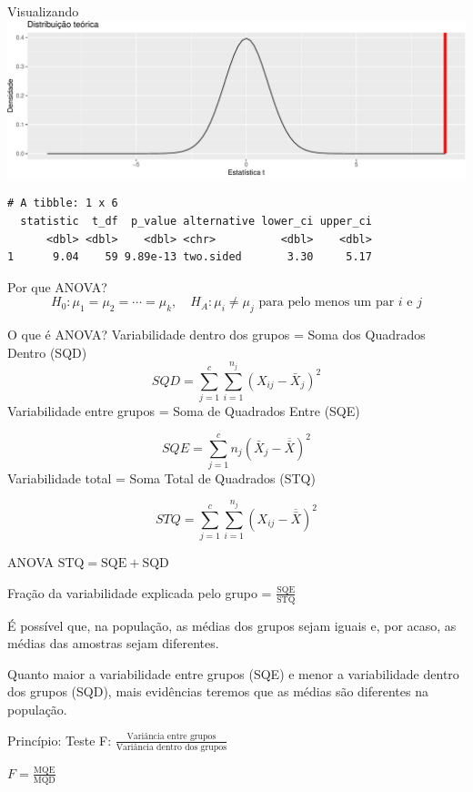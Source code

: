 \documentclass[
  9pt,
  ignorenonframetext,
  aspectratio=169]{beamer}
\begin{document}
\begin{frame}[fragile]{Visualizando}
\protect\hypertarget{visualizando-1}{}
\includegraphics{aula_11_files/figure-beamer/unnamed-chunk-13-1.pdf}

\begin{verbatim}
# A tibble: 1 x 6
  statistic  t_df  p_value alternative lower_ci upper_ci
      <dbl> <dbl>    <dbl> <chr>          <dbl>    <dbl>
1      9.04    59 9.89e-13 two.sided       3.30     5.17
\end{verbatim}
\end{frame}

\begin{frame}{Por que ANOVA?}
\protect\hypertarget{por-que-anova}{}
\[
H_{0}: \mu_{1}=\mu_{2}=\cdots=\mu_{k}, \quad H_{A}: \mu_{i} \neq \mu_{j} \text{ para pelo menos um par } i \text{ e } j
\]
\end{frame}

\begin{frame}{O que é ANOVA?}
\protect\hypertarget{o-que-uxe9-anova}{}
Variabilidade dentro dos grupos = Soma dos Quadrados Dentro (SQD) \[
S Q D=\sum_{j=1}^{c} \sum_{i=1}^{n_{j}}\left(X_{i j}-\bar{X}_{j}\right)^{2}
\] Variabilidade entre grupos = Soma de Quadrados Entre (SQE)

\[
S Q E=\sum_{j=1}^{c} n_{j}\left(\bar{X}_{j}-\overline{\bar{X}}\right)^{2}
\] Variabilidade total = Soma Total de Quadrados (STQ)

\[
S T Q=\sum_{j=1}^{c} \sum_{i=1}^{n_{j}}\left(X_{i j}-\overline{\bar{X}}\right)^{2}
\]
\end{frame}

\begin{frame}{ANOVA}
\protect\hypertarget{anova}{}
\(\text{STQ} = \text{SQE} + \text{SQD}\)

Fração da variabilidade explicada pelo grupo =
\(\frac{\text{SQE}}{\text{STQ}}\)

É possível que, na população, as médias dos grupos sejam iguais e, por
acaso, as médias das amostras sejam diferentes.

Quanto maior a variabilidade entre grupos (SQE) e menor a variabilidade
dentro dos grupos (SQD), mais evidências teremos que as médias são
diferentes na população.

Princípio: Teste F:
\(\frac{\text{Variância entre grupos}}{\text{Variância dentro dos grupos}}\)

\(F = \frac{\text{MQE}}{\text{MQD}}\)
\end{frame}
\end{document}
